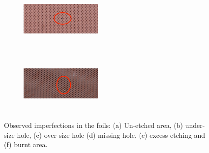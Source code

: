 \begin{figure}[!htbp]
\begin{subfigure}[b]{0.29\textwidth}
        \caption{ }
        \label{fig:O_5a}
    \end{subfigure}
    \centering
    \begin{subfigure}[b]{0.29\textwidth}
        \includegraphics[width=4cm, height=3cm]{figures/GEM/figures/3e.jpg}
        \caption{ }
        \label{fig:O_5b}
    \end{subfigure}
    \centering
    \begin{subfigure}[b]{0.29\textwidth}
        \includegraphics[width=4cm, height=3cm]{figures/GEM/figures/3f.jpg}
        \caption{ }
        \label{fig:O_5c}
    \end{subfigure}
   \caption{Observed imperfections in the foils: (a) Un-etched area, (b) under-size hole, (c) over-size hole (d) missing hole, (e) excess etching and (f) burnt area.} \label{fig:Optical_01}
\end{figure}
